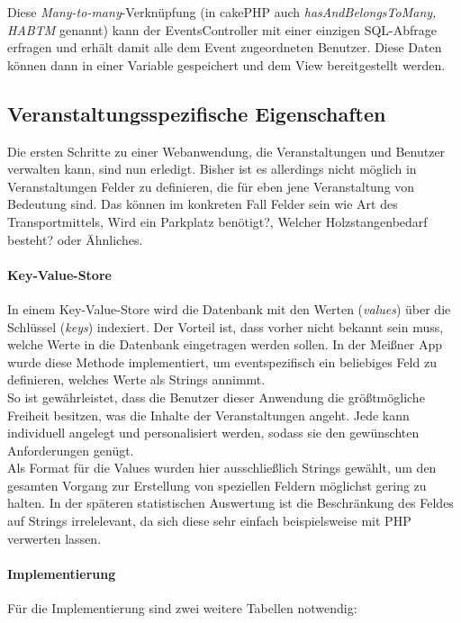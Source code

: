 Diese \emph{Many-to-many}-Verknüpfung (in cakePHP auch \emph{hasAndBelongsToMany, HABTM} genannt) kann der EventsController mit einer einzigen SQL-Abfrage erfragen und erhält damit alle dem Event zugeordneten Benutzer. Diese Daten können dann in einer Variable gespeichert und dem View bereitgestellt werden.

\subsection{Veranstaltungsspezifische Eigenschaften}
Die ersten Schritte zu einer Webanwendung, die Veranstaltungen und Benutzer verwalten kann, sind nun erledigt. Bisher ist es allerdings nicht möglich in Veranstaltungen Felder zu definieren, die für eben jene Veranstaltung von Bedeutung sind. Das können im konkreten Fall Felder sein wie \glqq Art des Transportmittels\grqq{}, \glqq Wird ein Parkplatz benötigt?\grqq{}, \glqq Welcher Holzstangenbedarf besteht?\grqq{} oder Ähnliches.\par

\paragraph{Key-Value-Store} In einem Key-Value-Store wird die Datenbank mit den Werten (\emph{values}) über die Schlüssel (\emph{keys}) indexiert. Der Vorteil ist, dass vorher nicht bekannt sein muss, welche Werte in die Datenbank eingetragen werden sollen. In der Meißner App wurde diese Methode implementiert, um eventspezifisch ein beliebiges Feld zu definieren, welches Werte als Strings annimmt.\\
So ist gewährleistet, dass die Benutzer dieser Anwendung die größtmögliche Freiheit besitzen, was die Inhalte der Veranstaltungen angeht. Jede kann individuell angelegt und personalisiert werden, sodass sie den gewünschten Anforderungen genügt.\\
Als Format für die Values wurden hier ausschließlich Strings gewählt, um den gesamten Vorgang zur Erstellung von speziellen Feldern möglichst gering zu halten. In der späteren statistischen Auswertung ist die Beschränkung des Feldes auf Strings irrelelevant, da sich diese sehr einfach beispielsweise mit PHP verwerten lassen.\par

\paragraph{Implementierung}
Für die Implementierung sind zwei weitere Tabellen notwendig: 

